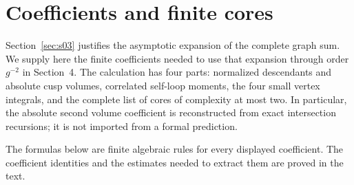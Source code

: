\section{Coefficients and finite cores}
\label{sec:appendix-a}

Section~\ref{sec:s03} justifies the asymptotic expansion of the complete
graph sum. We supply here the finite coefficients needed to use that
expansion through order $g^{-2}$ in Section~4. The calculation has four
parts: normalized descendants and absolute cusp volumes, correlated
self-loop moments, the four small vertex integrals, and the complete
list of cores of complexity at most two. In particular, the absolute
second volume coefficient is reconstructed from exact intersection
recursions; it is not imported from a formal prediction.

The formulas below are finite algebraic rules for every displayed
coefficient. The coefficient identities and the estimates needed to
extract them are proved in the text.





